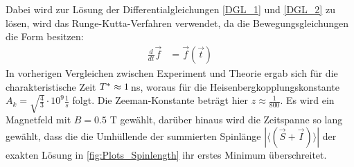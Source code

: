 Dabei wird zur Lösung der Differentialgleichungen \ref{DGL_1} und \ref{DGL_2} zu lösen, wird das Runge-Kutta-Verfahren verwendet, da die 
Bewegungsgleichungen die Form besitzen:
\begin{align}
    \frac{d}{dt}\vec{f} &= \vec{f}(\vec{t}) 
\end{align}
In vorherigen Vergleichen zwischen Experiment und Theorie ergab sich für die charakteristische Zeit $T^*\approx 1 \thinspace$ns\cite{PhysRevB.89.045317}, 
woraus für die Heisenbergkopplungskonstante $A_k = \sqrt{\frac{4}{3}}\cdot 10^9 \frac{1}{s}$ folgt. Die Zeeman-Konstante beträgt hier 
$z\approx\frac{1}{800}$. Es wird ein Magnetfeld mit $B = 0.5$ T gewählt, darüber hinaus wird die Zeitspanne so lang gewählt, dass die die Umhüllende der 
summierten Spinlänge $|\langle \left( \vec{S}+\vec{I} \right)\rangle |$  der exakten Lösung in \autoref{fig:Plots_Spinlength} ihr erstes Minimum 
überschreitet.
